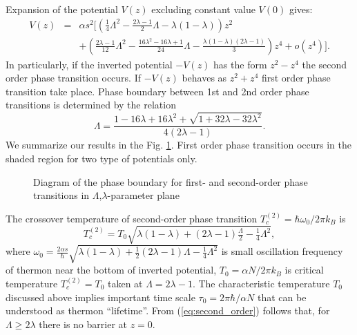 \documentclass[aps, pre, preprint, groupedaddress, superscriptaddress, showkeys, showpacs] {revtex4-1}
\begin{document}
Expansion of the potential $V(z)$ excluding constant value $V(0)$ gives:
%
\begin{equation}
\begin{array}{lcl}
V(z) & = & \alpha s^2 \Big[ \left( \frac{1}{4} \Lambda^2  - \frac{2\lambda - 1}{2} \Lambda - \lambda (1 - \lambda) \right) z^2 \\
&& + \left( \frac{2\lambda - 1}{12} \Lambda^2 - \frac{16\lambda^2 - 16\lambda + 1}{24} \Lambda - \frac{\lambda (1 - \lambda) (2\lambda - 1)}{3} \right) z^4 + o(z^4) \Big].
\end{array}
\label{eq:potential_teylor}
\end{equation}
%
In particularly, if the inverted potential $-V(z)$ has the form $z^2 - z^4$ the second order phase transition occurs.
If $-V(z)$ behaves as $z^2 + z^4$ first order phase transition take place.
Phase boundary between 1st and 2nd order phase transitions is determined by the relation
%
\begin{equation}
\Lambda = \frac{1 - 16\lambda + 16\lambda^2 + \sqrt{1 + 32\lambda - 32\lambda^2}}{4(2\lambda - 1)}.
\label{eq:order_border}
\end{equation}
%
We summarize our results in the Fig. \ref{pic:phase_boundary_combined}.  First order phase transition occurs in the shaded region for two type of potentials only. 
%
\begin{figure}[ht]
\caption{Diagram of the phase boundary for  first- and second-order  phase transitions in $\Lambda$,$\lambda$-parameter plane \label{pic:phase_boundary_combined}}
\end{figure}
%

The crossover temperature of second-order phase transition $T_{c}^{(2)} = \hbar \omega_0/ 2 \pi k_B$ is 
%
\begin{equation}
T_{c}^{(2)} = T_{0} \sqrt{\lambda (1 - \lambda) + (2 \lambda - 1) \tfrac{\Lambda}{2} - \tfrac{1}{4} \Lambda^2},
\label{eq:second_order}
\end{equation}
%
where  $\omega_0 = \frac{2 \alpha s}{\hbar} \sqrt{\lambda (1 - \lambda) + \tfrac{1}{2} (2 \lambda - 1) \Lambda - \tfrac{1}{4} \Lambda^2}$ is small oscillation frequency of thermon near the bottom of inverted potential, $T_{0}=\alpha N / 2\pi k_B$ is critical temperature $T_{c}^{(2)}=T_{0}$ taken at $\Lambda=2\lambda-1$.
The characteristic temperature $T_{0}$ discussed above implies important time scale $\tau_0=2\pi\hbar/ \alpha N$ that can be understood as thermon ``lifetime''.
From (\ref{eq:second_order}) follows that, for $\Lambda \ge 2\lambda$ there is no barrier at $z = 0$.
\end{document}
